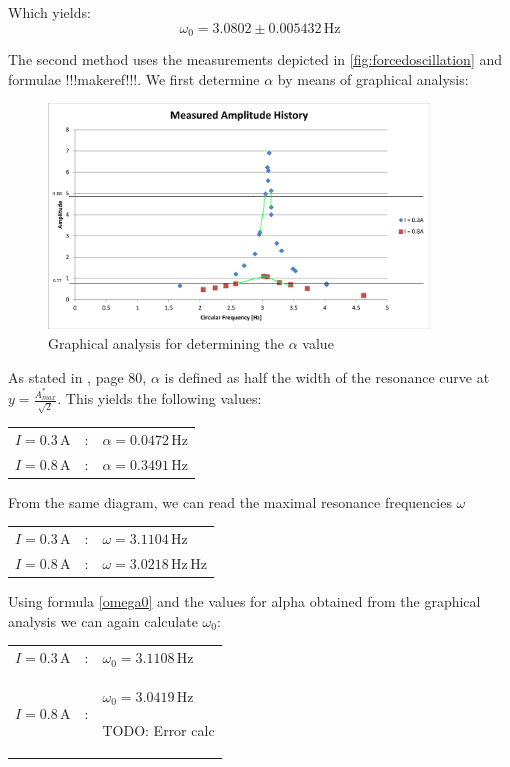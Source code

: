 \documentclass{scrreprt}
\newcommand{\unit}[1]{\ensuremath{\, \mathrm{#1}}}
\begin{document}
Which yields:
\begin{equation}
\omega_0 = 3.0802 \pm 0.005432 \unit{Hz}
\end{equation}

The second method uses the measurements depicted in \ref{fig:forcedoscillation} and formulae !!!makeref!!!.
We first determine $\alpha$ by means of graphical analysis:

\begin{figure}[H]
	\centering
  \includegraphics[width=0.9\textwidth]{diag/Width_measurement.png}
	\caption{Graphical analysis for determining the $\alpha$ value}
	\label{fig:graphical}
\end{figure}

As stated in \cite{physcript13}, page 80, $\alpha$ is defined as half the width of the resonance curve at $y=\frac{A^*_{max}}{\sqrt{2}}$. This yields the following values:

\begin{table}[H]
\center
\begin{tabular}{lcl}
$I = 0.3 \unit{A}$ &:& $\alpha = 0.0472\unit{Hz}$\\
$I = 0.8 \unit{A}$ &:& $\alpha = 0.3491\unit{Hz}$
\end{tabular}
\end{table}

From the same diagram, we can read the maximal resonance frequencies $\omega$

\begin{table}[H]
\center
\begin{tabular}{lcl}
$I = 0.3 \unit{A}$ &:& $\omega = 3.1104\unit{Hz}$\\
$I = 0.8 \unit{A}$ &:& $\omega = 3.0218\unit{Hz}
\unit{Hz}$
\end{tabular}
\end{table}

Using formula \ref{omega0} and the values for alpha obtained from the graphical analysis we can again calculate $\omega_0$:
\begin{table}[H]
\center
\begin{tabular}{lcl}
$I = 0.3 \unit{A}$ &:& $\omega_0 = 3.1108\unit{Hz}$\\
$I = 0.8 \unit{A}$ &:& $\omega_0 = 3.0419
\unit{Hz}$

TODO: Error calc
\end{tabular}
\end{table}
\end{document}
